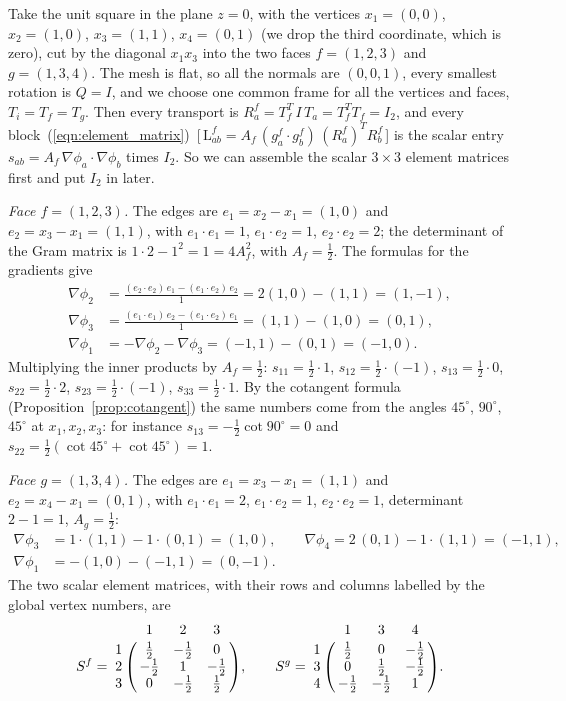 \begin{example}
\label{ex:s1b_square}
Take the unit square in the plane $z = 0$, with the vertices $x_1 = (0, 0)$, $x_2 = (1, 0)$, $x_3 = (1, 1)$, $x_4 = (0, 1)$ (we drop the third coordinate, which is zero), cut by the diagonal $x_1x_3$ into the two faces $f = (1, 2, 3)$ and $g = (1, 3, 4)$. The mesh is flat, so all the normals are $(0, 0, 1)$, every smallest rotation is $Q = I$, and we choose one common frame for all the vertices and faces, $T_i = T_f = T_g$. Then every transport is $R_a^f = T_f^T\, I\, T_a = T_f^TT_f = I_2$, and every block~(\ref{eqn:element_matrix})~[\,$\mathrm L^f_{ab} = A_f\,(g_a^f\cdot g_b^f)\,(R_a^f)^TR_b^f$\,] is the scalar entry $s_{ab} = A_f\, \nabla\phi_a\cdot\nabla\phi_b$ times $I_2$. So we can assemble the scalar $3\times 3$ element matrices first and put $I_2$ in later.

\emph{Face $f = (1, 2, 3)$.} The edges are $e_1 = x_2 - x_1 = (1, 0)$ and $e_2 = x_3 - x_1 = (1, 1)$, with $e_1\cdot e_1 = 1$, $e_1\cdot e_2 = 1$, $e_2\cdot e_2 = 2$; the determinant of the Gram matrix is $1\cdot 2 - 1^2 = 1 = 4A_f^2$, with $A_f = \frac12$. The formulas for the gradients give
\begin{align*}
\nabla\phi_2 &= \frac{(e_2\cdot e_2)\, e_1 - (e_1\cdot e_2)\, e_2}{1} = 2(1, 0) - (1, 1) = (1, -1), \\
\nabla\phi_3 &= \frac{(e_1\cdot e_1)\, e_2 - (e_1\cdot e_2)\, e_1}{1} = (1, 1) - (1, 0) = (0, 1), \\
\nabla\phi_1 &= -\nabla\phi_2 - \nabla\phi_3 = (-1, 1) - (0, 1) = (-1, 0) .
\end{align*}
Multiplying the inner products by $A_f = \frac12$: $s_{11} = \frac12\cdot 1$, $s_{12} = \frac12\cdot(-1)$, $s_{13} = \frac12\cdot 0$, $s_{22} = \frac12\cdot 2$, $s_{23} = \frac12\cdot(-1)$, $s_{33} = \frac12\cdot 1$. By the cotangent formula (Proposition~\ref{prop:cotangent}) the same numbers come from the angles $45^\circ$, $90^\circ$, $45^\circ$ at $x_1, x_2, x_3$: for instance $s_{13} = -\frac12\cot 90^\circ = 0$ and $s_{22} = \frac12(\cot 45^\circ + \cot 45^\circ) = 1$.

\emph{Face $g = (1, 3, 4)$.} The edges are $e_1 = x_3 - x_1 = (1, 1)$ and $e_2 = x_4 - x_1 = (0, 1)$, with $e_1\cdot e_1 = 2$, $e_1\cdot e_2 = 1$, $e_2\cdot e_2 = 1$, determinant $2 - 1 = 1$, $A_g = \frac12$:
\begin{align*}
\nabla\phi_3 &= 1\cdot(1, 1) - 1\cdot(0, 1) = (1, 0), \qquad \nabla\phi_4 = 2\,(0, 1) - 1\cdot(1, 1) = (-1, 1), \\
\nabla\phi_1 &= -(1, 0) - (-1, 1) = (0, -1) .
\end{align*}
The two scalar element matrices, with their rows and columns labelled by the global vertex numbers, are
\begin{equation*}
S^f = \bordermatrix{ & 1 & 2 & 3 \cr 1 & \frac12 & -\frac12 & 0 \cr 2 & -\frac12 & 1 & -\frac12 \cr 3 & 0 & -\frac12 & \frac12}, \qquad
S^g = \bordermatrix{ & 1 & 3 & 4 \cr 1 & \frac12 & 0 & -\frac12 \cr 3 & 0 & \frac12 & -\frac12 \cr 4 & -\frac12 & -\frac12 & 1} .
\end{equation*}


\end{example}
